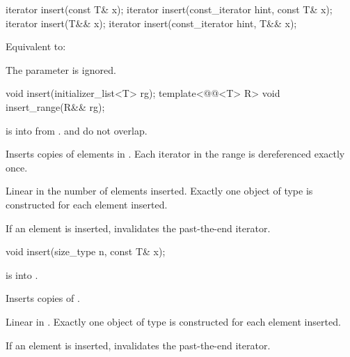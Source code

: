 %
\begin{itemdecl}
iterator insert(const T& x);
iterator insert(const_iterator hint, const T& x);
iterator insert(T&& x);
iterator insert(const_iterator hint, T&& x);
\end{itemdecl}

\begin{itemdescr}
\pnum
\effects
Equivalent to: 
\begin{note}
The  parameter is ignored.
\end{note}
\end{itemdescr}

%
\begin{itemdecl}
void insert(initializer_list<T> rg);
template<@@<T> R>
  void insert_range(R&& rg);
\end{itemdecl}

\begin{itemdescr}
\pnum
\expects
{} is  into 
from .
 and  do not overlap.

\pnum
\effects
Inserts copies of elements in .
Each iterator in the range  is dereferenced exactly once.

\pnum
\complexity
Linear in the number of elements inserted.
Exactly one object of type  is constructed for each element inserted.

\pnum
\remarks
If an element is inserted, invalidates the past-the-end iterator.
\end{itemdescr}

%
\begin{itemdecl}
void insert(size_type n, const T& x);
\end{itemdecl}

\begin{itemdescr}
\pnum
\expects
{} is  into .

\pnum
\effects
Inserts  copies of .

\pnum
\complexity
Linear in .
Exactly one object of type  is constructed for each element inserted.

\pnum
\remarks
If an element is inserted, invalidates the past-the-end iterator.
\end{itemdescr}

